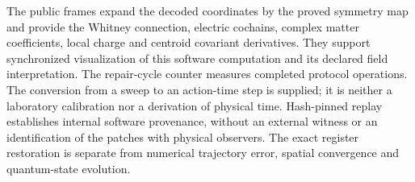 The public frames expand the decoded coordinates by the proved symmetry
map and provide the Whitney connection, electric cochains, complex matter
coefficients, local charge and centroid covariant derivatives. They support
synchronized visualization of this software computation and its declared
field interpretation. The repair-cycle counter measures completed protocol
operations. The conversion from a sweep to an action-time step is supplied;
it is neither a laboratory calibration nor a derivation of physical time.
Hash-pinned replay establishes internal software provenance, without an
external witness or an identification of the patches with physical observers.
The exact register restoration is separate from numerical trajectory error,
spatial convergence and quantum-state evolution.
